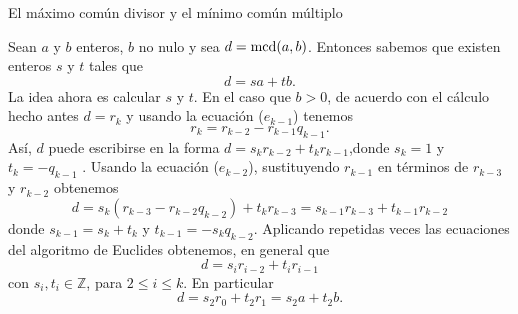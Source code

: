 \begin{section}{El máximo común divisor y el mínimo común múltiplo}



Sean $a$ y $b$ enteros, $b$ no nulo y sea $d=\operatorname{mcd}(a,b)$. Entonces sabemos que existen enteros $s$ y $t$ tales que
$$
d=sa+tb.
$$
La idea ahora es calcular $s$ y $t$. En el caso que $b >0$, de acuerdo con el cálculo hecho antes $d=r_{k}$ y usando la  ecuación ($e_{k-1}$) tenemos
$$
r_{k}=r_{k-2} -r_{k-1}q_{k-1}.
$$
As{í}, $d$ puede escribirse en la forma $ d = s_{k}r_{k-2} +t_{k}r_{k-1}$,donde $s_{k}=1$ y $t_{k}=-q_{k-1}$ . Usando la ecuación  ($e_{k-2}$), sustituyendo $r_{k-1}$ en términos de $r_{k-3}$ y $r_{k-2}$ obtenemos
$$
d= s_{k}(r_{k-3}-r_{k-2}q_{k-2}) + t_{k}r_{k-3} =  s_{k-1}r_{k-3} +t_{k-1}r_{k-2}
$$
donde $s_{k-1} = s_{k} + t_{k} $ y $t_{k-1}= -s_{k}q_{k-2}$.  Aplicando  repetidas veces las ecuaciones del algoritmo de Euclides obtenemos, en general que 
$$
d =  s_{i}r_{i-2} +t_{i}r_{i-1}
$$
con  $s_{i}, t_{i} \in \mathbb Z$, para $2 \le i \le k$. En particular 
$$
d =  s_{2}r_{0} +t_{2}r_{1} = s_{2}a +t_{2}b.
$$


\end{section}
